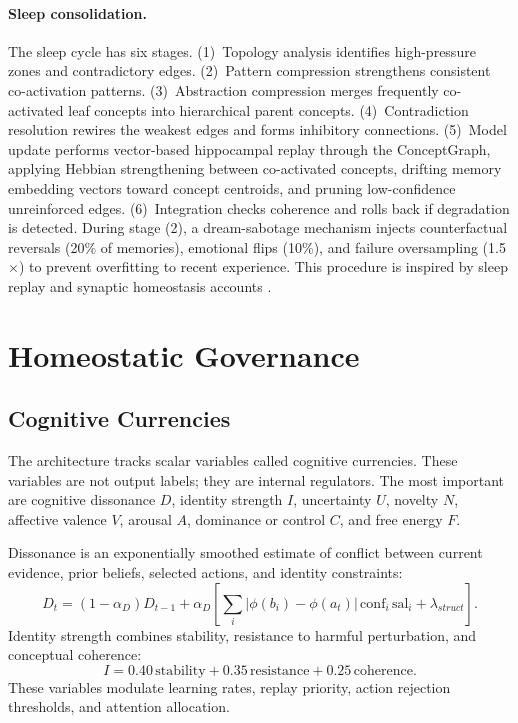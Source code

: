 \documentclass[11pt]{article}
\begin{document}
\paragraph{Sleep consolidation.}
The sleep cycle has six stages. (1)~Topology analysis identifies high-pressure zones and contradictory edges. (2)~Pattern compression strengthens consistent co-activation patterns. (3)~Abstraction compression merges frequently co-activated leaf concepts into hierarchical parent concepts. (4)~Contradiction resolution rewires the weakest edges and forms inhibitory connections. (5)~Model update performs vector-based hippocampal replay through the ConceptGraph, applying Hebbian strengthening between co-activated concepts, drifting memory embedding vectors toward concept centroids, and pruning low-confidence unreinforced edges. (6)~Integration checks coherence and rolls back if degradation is detected. During stage (2), a dream-sabotage mechanism injects counterfactual reversals (20\% of memories), emotional flips (10\%), and failure oversampling (1.5$\times$) to prevent overfitting to recent experience. This procedure is inspired by sleep replay and synaptic homeostasis accounts \cite{tononi2006,walker2006,diekelmann2010,wilson1994,ji2007}.

\section{Homeostatic Governance}
\subsection{Cognitive Currencies}
The architecture tracks scalar variables called cognitive currencies. These variables are not output labels; they are internal regulators. The most important are cognitive dissonance $D$, identity strength $I$, uncertainty $U$, novelty $N$, affective valence $V$, arousal $A$, dominance or control $C$, and free energy $F$.

Dissonance is an exponentially smoothed estimate of conflict between current evidence, prior beliefs, selected actions, and identity constraints:
\begin{equation}
 D_t=(1-\alpha_D)D_{t-1}+\alpha_D\left[\sum_i \left|\phi(b_i)-\phi(a_t)\right|\,\mathrm{conf}_i\,\mathrm{sal}_i+\lambda_{struct}\right].
\end{equation}
Identity strength combines stability, resistance to harmful perturbation, and conceptual coherence:
\begin{equation}
 I = 0.40\,\mathrm{stability}+0.35\,\mathrm{resistance}+0.25\,\mathrm{coherence}.
\end{equation}
These variables modulate learning rates, replay priority, action rejection thresholds, and attention allocation.
\end{document}
